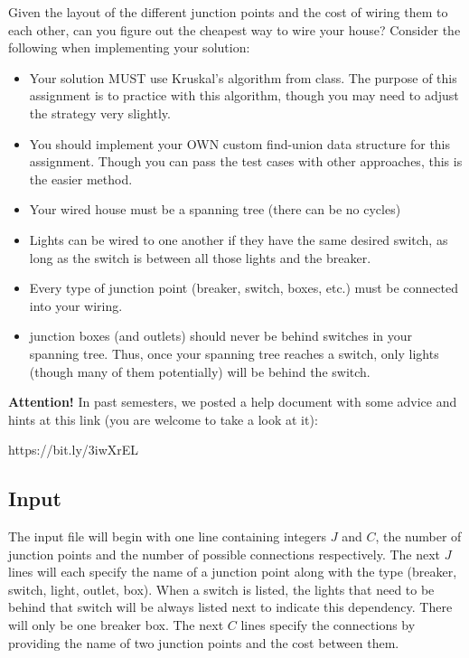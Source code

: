 \documentclass[11pt]{article}
\begin{document}
Given the layout of the different junction points and the cost of wiring them to each other, can you figure out the cheapest way to wire your house? Consider the following when implementing your solution:

\begin{itemize}
	\item Your solution MUST use Kruskal's algorithm from class. The purpose of this assignment is to practice with this algorithm, though you may need to adjust the strategy very slightly.
	\item You should implement your OWN custom find-union data structure for this assignment. Though you can pass the test cases with other approaches, this is the easier method.
	\item Your wired house must be a spanning tree (there can be no cycles)
	\item Lights can be wired to one another if they have the same desired switch, as long as the switch is between all those lights and the breaker.
	\item Every type of junction point (breaker, switch, boxes, etc.) must be connected into your wiring. 
	\item junction boxes (and outlets) should never be behind switches in your spanning tree. Thus, once your spanning tree reaches a switch, only lights (though many of them potentially) will be behind the switch.
\end{itemize}

{\bf Attention!}  In past semesters, we posted a help document with some advice and hints at this link (you are welcome to take a look at it): \\
\begin{verb}
https://bit.ly/3iwXrEL
\end{verb}

\subsection*{Input}
The input file will begin with one line containing integers $J$ and $C$, the number of junction points and the number of possible connections respectively. The next $J$ lines will each specify the name of a junction point along with the type (breaker, switch, light, outlet, box). When a switch is listed, the lights that need to be behind that switch will be always listed next to indicate this dependency. There will only be one breaker box. The next $C$ lines specify the connections by providing the name of two junction points and the cost between them.
\end{document}
